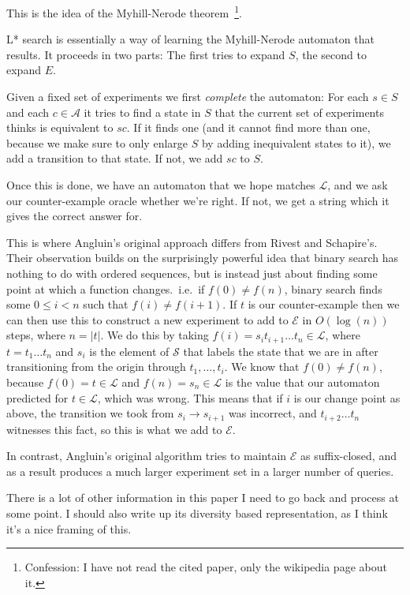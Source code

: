 \documentclass[a4paper]{book}
\begin{document}
This is the idea of the Myhill-Nerode theorem~\cite{nerode1958linear}\footnote{Confession:
I have not read the cited paper,
only the wikipedia page about it.
}.

L* search is essentially a way of learning the Myhill-Nerode automaton that results.
It proceeds in two parts:
The first tries to expand \(S\),
the second to expand \(E\).

Given a fixed set of experiments we first \emph{complete} the automaton:
For each \(s \in S\) and each \(c \in \mathcal{A}\) it tries to find a state in \(S\) that the current set of experiments thinks is equivalent to \(sc\).
If it finds one (and it cannot find more than one,
because we make sure to only enlarge \(S\) by adding inequivalent states to it),
we add a transition to that state.
If not,
we add \(sc\) to \(S\).

Once this is done,
we have an automaton that we hope matches \(\mathcal{L}\),
and we ask our counter-example oracle whether we're right.
If not,
we get a string which it gives the correct answer for.

This is where Angluin's original approach differs from Rivest and Schapire's.
Their observation builds on the surprisingly powerful idea that binary search has nothing to do with ordered sequences,
but is instead just about finding some point at which a function changes.\ 
i.e.\ if \(f(0) \neq f(n)\),
binary search finds some \(0 \leq i < n\) such that \(f(i) \neq f(i + 1)\).
If \(t\) is our counter-example then we can then use this to construct a new experiment to add to \(\mathcal{E}\) in \(O(\log(n))\) steps,
where \(n = |t|\).
We do this by taking \(f(i) = s_i t_{i+1} \ldots t_{n} \in \mathcal{L}\),
where \(t = t_1 \ldots t_n\) and \(s_i\) is the element of \(\mathcal{S}\) that labels the state that we are in after transitioning from the origin through
\(t_1, \ldots, t_i\).
We know that \(f(0) \neq f(n)\),
because \(f(0) = t \in \mathcal{L}\) and \(f(n) = s_n \in \mathcal{L}\) is the value that our automaton predicted for \(t \in \mathcal{L}\),
which was wrong.
This means that if \(i\) is our change point as above,
the transition we took from \(s_i \to s_{i + 1}\) was incorrect,
and \(t_{i + 2} \ldots t_n\) witnesses this fact,
so this is what we add to \(\mathcal{E}\).

In contrast,
Angluin's original algorithm tries to maintain \(\mathcal{E}\) as suffix-closed,
and as a result produces a much larger experiment set in a larger number of queries.

There is a lot of other information in this paper I need to go back and process at some point.
I should also write up its diversity based representation,
as I think it's a nice framing of this.
\end{document}

